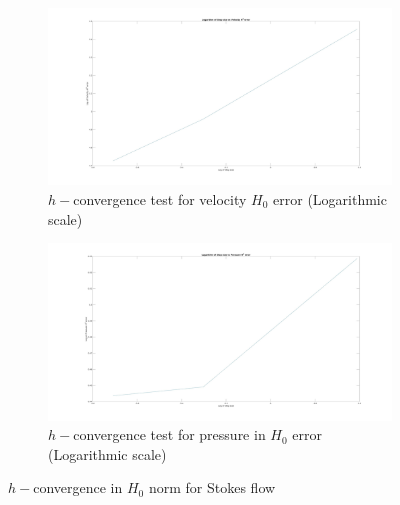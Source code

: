 \documentclass[a4paper,openany]{book}
\begin{document}
\begin{figure}
\begin{subfigure}{\textwidth}	
  \includegraphics[width=\linewidth]{h0_velocity_log_stokes.jpg}
  \caption{$h-$convergence test for velocity $H_0$ error (Logarithmic scale)}
  \label{fig:vel_stoke_conv_log_h0}
\end{subfigure}
\begin{subfigure}{\textwidth}	
  \includegraphics[width=\linewidth]{h0_pressure_log_stokes.jpg}
  \caption{$h-$convergence test for pressure in $H_0$ error (Logarithmic scale)}
  \label{fig:pre_stoke_conv_log_h0}
\end{subfigure}
\caption{$h-$convergence in $H_0$ norm for Stokes flow}
\label{fig:h0_stokes}
\end{figure}
\end{document}
